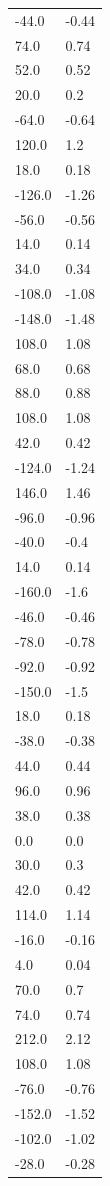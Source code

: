 \begin{longtable}{ll}
-44.0 & -0.44 \\
74.0 & 0.74 \\
52.0 & 0.52 \\
20.0 & 0.2 \\
-64.0 & -0.64 \\
120.0 & 1.2 \\
18.0 & 0.18 \\
-126.0 & -1.26 \\
-56.0 & -0.56 \\
14.0 & 0.14 \\
34.0 & 0.34 \\
-108.0 & -1.08 \\
-148.0 & -1.48 \\
108.0 & 1.08 \\
68.0 & 0.68 \\
88.0 & 0.88 \\
108.0 & 1.08 \\
42.0 & 0.42 \\
-124.0 & -1.24 \\
146.0 & 1.46 \\
-96.0 & -0.96 \\
-40.0 & -0.4 \\
14.0 & 0.14 \\
-160.0 & -1.6 \\
-46.0 & -0.46 \\
-78.0 & -0.78 \\
-92.0 & -0.92 \\
-150.0 & -1.5 \\
18.0 & 0.18 \\
-38.0 & -0.38 \\
44.0 & 0.44 \\
96.0 & 0.96 \\
38.0 & 0.38 \\
0.0 & 0.0 \\
30.0 & 0.3 \\
42.0 & 0.42 \\
114.0 & 1.14 \\
-16.0 & -0.16 \\
4.0 & 0.04 \\
70.0 & 0.7 \\
74.0 & 0.74 \\
212.0 & 2.12 \\
108.0 & 1.08 \\
-76.0 & -0.76 \\
-152.0 & -1.52 \\
-102.0 & -1.02 \\
-28.0 & -0.28 \\

\end{longtable}
